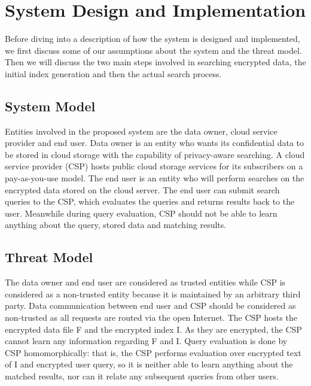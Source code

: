 \section{System Design and Implementation}
\label{sec:system}

Before diving into a description of how the system
is designed and implemented, we first discuss some of our assumptions
about the system and the threat model. Then we will discuss the two main
steps involved in searching encrypted data, the initial index generation
and then the actual search process.

\subsection{System Model}

Entities involved in the proposed system are the data owner, cloud service 
provider and end user. Data owner is an entity who wants its confidential 
data to be stored in cloud storage with the capability of privacy-aware searching. 
A cloud service provider (CSP) hosts public cloud storage services for its subscribers on 
a pay-as-you-use model. The end user is an entity who will perform searches on the 
encrypted data stored on the cloud server. The end user can submit search queries 
to the CSP, which evaluates the queries and returns results back to the user. 
Meanwhile during query evaluation, CSP should not be able to learn anything about the query, stored 
data and matching results.

\subsection{Threat Model}

The data owner and end user are considered as trusted entities while CSP 
is considered as a non-trusted entity because it is maintained by an 
arbitrary third party. Data communication between end user and CSP should 
be considered as non-trusted as all requests are routed via the open Internet. 
The CSP hosts the encrypted data file F and the encrypted index I. 
As they are encrypted, the CSP cannot learn any information regarding F and I. 
Query evaluation is done by CSP homomorphically: that is, the CSP performs 
evaluation over encrypted text of I and encrypted user query, 
so it is neither able to learn anything about the matched results, nor
can it relate any subsequent queries from other users. 


